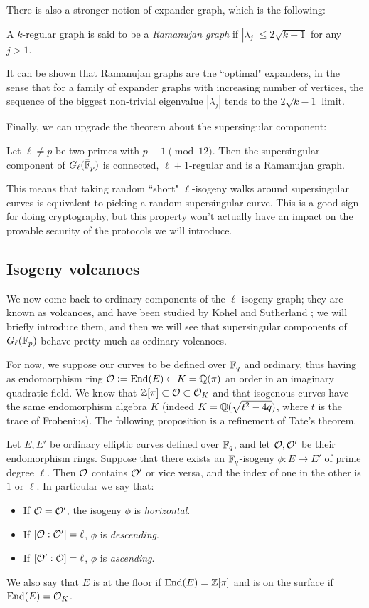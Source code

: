 There is also a stronger notion of expander graph, which is the following:
\begin{definition}
    A $k$-regular graph is said to be a \emph{Ramanujan graph} if $|\lambda_j|\le2\sqrt{k-1}$ for any $j>1$.
\end{definition}
It can be shown that Ramanujan graphs are the ``optimal" expanders, in the sense that for a family of expander graphs with increasing number of vertices, the sequence of the biggest non-trivial eigenvalue $|\lambda_j|$ tends to the $2\sqrt{k-1}$ limit.

Finally, we can upgrade the theorem about the supersingular component:
\begin{theorem}
    Let $\ell\neq p$ be two primes with $p\equiv1\pmod{12}$. Then the supersingular component of $G_\ell(\bar{\mathbb{F}}_p)$ is connected, $\ell+1$-regular and is a Ramanujan graph.
\end{theorem}
This means that taking random ``short" $\ell$-isogeny walks around supersingular curves is equivalent to picking a random supersingular curve. This is a good sign for doing cryptography, but this property won't actually have an impact on the provable security of the protocols we will introduce.

\subsection{Isogeny volcanoes}
We now come back to ordinary components of the $\ell$-isogeny graph; they are known as volcanoes, and have been studied by Kohel \cite{Kohel_thesis} and Sutherland \cite{Sutherland_volcanoes}; we will briefly introduce them, and then we will see that supersingular components of $G_\ell(\mathbb{F}_p)$ behave pretty much as ordinary volcanoes.

For now, we suppose our curves to be defined over $\mathbb{F}_q$ and ordinary, thus having as endomorphism ring $\mathcal{O}:=\operatorname{End}(E)\subset K=\mathbb{Q}(\pi)$ an order in an imaginary quadratic field. We know that $\mathbb{Z}[\pi]\subset \mathcal{O}\subset\mathcal{O}_K$ and that isogenous curves have the same endomorphism algebra $K$ (indeed $K=\mathbb{Q}(\sqrt{t^2-4q})$, where $t$ is the trace of Frobenius). The following proposition is a refinement of Tate's theorem.
\begin{proposition}
    Let $E,E'$ be ordinary elliptic curves defined over $\mathbb{F}_q$, and let $\mathcal{O},\mathcal{O}'$ be their endomorphism rings. Suppose that there exists an $\mathbb{F}_q$-isogeny $\phi:E\to E'$ of prime degree $\ell$. Then $\mathcal{O}$ contains $\mathcal{O}'$ or vice versa, and the index of one in the other is $1$ or $\ell$. In particular we say that:
    \begin{itemize}
        \item If $\mathcal{O}=\mathcal{O}'$, the isogeny $\phi$ is \emph{horizontal}.
        \item If $[\mathcal{O}:\mathcal{O}']=\ell$, $\phi$ is \emph{descending}.
        \item If $[\mathcal{O}':\mathcal{O}]=\ell$, $\phi$ is \emph{ascending}.
    \end{itemize}
\end{proposition}
We also say that $E$ is at the floor if $\operatorname{End}(E)=\mathbb{Z}[\pi]$ and is on the surface if $\operatorname{End}(E)=\mathcal{O}_K$.

